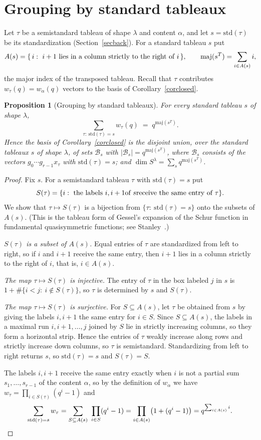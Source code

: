 \documentclass[11pt, letterpaper]{amsart}
\let\amstext\text
\renewcommand{\text}[1]{\amstext{\upshape #1}}%
\newtheorem{proposition}{Proposition}
\theoremstyle{definition}
\theoremstyle{remark}
\newcommand{\std}{\mathrm{std}}
\newcommand{\maj}{\mathrm{maj}}
\begin{document}
\section{Grouping by standard tableaux}\label{secstd}

Let $\tau$ be a semistandard tableau of shape $\lambda$ and content $\alpha$, and let $s=\std(\tau)$ be its standardization (Section~\ref{secback}). For a standard tableau $s$ put
\[
A(s)=\{\,i:\ i+1\ \text{lies in a column strictly to the right of}\ i\,\},\qquad \maj(s^T)=\sum_{i\in A(s)}i,
\]
the major index of the transposed tableau. Recall that $\tau$ contributes $w_\tau(q)=w_\alpha(q)$ vectors to the basis of Corollary~\ref{corclosed}.

\begin{proposition}[Grouping by standard tableaux]\label{propstd}
For every standard tableau $s$ of shape $\lambda$,
\[
\sum_{\tau:\ \std(\tau)=s}w_\tau(q)\;=\;q^{\maj(s^T)} .
\]
Hence the basis of Corollary~\ref{corclosed} is the disjoint union, over the standard tableaux $s$ of shape $\lambda$, of sets $\mathcal B_s$ with $|\mathcal B_s|=q^{\maj(s^T)}$, where $\mathcal B_s$ consists of the vectors $g_0\cdots g_{r-1}x_\tau$ with $\std(\tau)=s$; and $\dim S^\lambda=\sum_sq^{\maj(s^T)}$.
\end{proposition}
\begin{proof}
Fix $s$. For a semistandard tableau $\tau$ with $\std(\tau)=s$ put
\[
S(\tau)=\{i:\ \text{the labels } i,i+1 \text{ of } s \text{ receive the same entry of } \tau\}.
\]
We show that $\tau\mapsto S(\tau)$ is a bijection from $\{\tau:\ \std(\tau)=s\}$ onto the subsets of $A(s)$. (This is the tableau form of Gessel's expansion of the Schur function in fundamental quasisymmetric functions; see Stanley~\cite[Theorem~7.19.7]{Stanley}.)

\emph{$S(\tau)$ is a subset of $A(s)$.} Equal entries of $\tau$ are standardized from left to right, so if $i$ and $i+1$ receive the same entry, then $i+1$ lies in a column strictly to the right of $i$, that is, $i\in A(s)$.

\emph{The map $\tau\mapsto S(\tau)$ is injective.} The entry of $\tau$ in the box labeled $j$ in $s$ is $1+\#\{i<j:\ i\notin S(\tau)\}$, so $\tau$ is determined by $s$ and $S(\tau)$.

\emph{The map $\tau\mapsto S(\tau)$ is surjective.} For $S\subseteq A(s)$, let $\tau$ be obtained from $s$ by giving the labels $i,i+1$ the same entry for $i\in S$. Since $S\subseteq A(s)$, the labels in a maximal run $i,i+1,\dots,j$ joined by $S$ lie in strictly increasing columns, so they form a horizontal strip. Hence the entries of $\tau$ weakly increase along rows and strictly increase down columns, so $\tau$ is semistandard. Standardizing from left to right returns $s$, so $\std(\tau)=s$ and $S(\tau)=S$.

The labels $i,i+1$ receive the same entry exactly when $i$ is not a partial sum $s_1,\dots,s_{r-1}$ of the content $\alpha$, so by the definition of $w_\alpha$ we have $w_\tau=\prod_{i\in S(\tau)}(q^i-1)$ and
\[
\sum_{\std(\tau)=s}w_\tau=\sum_{S\subseteq A(s)}\ \prod_{i\in S}(q^i-1)=\prod_{i\in A(s)}\bigl(1+(q^i-1)\bigr)=q^{\sum_{i\in A(s)}i}.\qedhere
\]
\end{proof}
\end{document}
